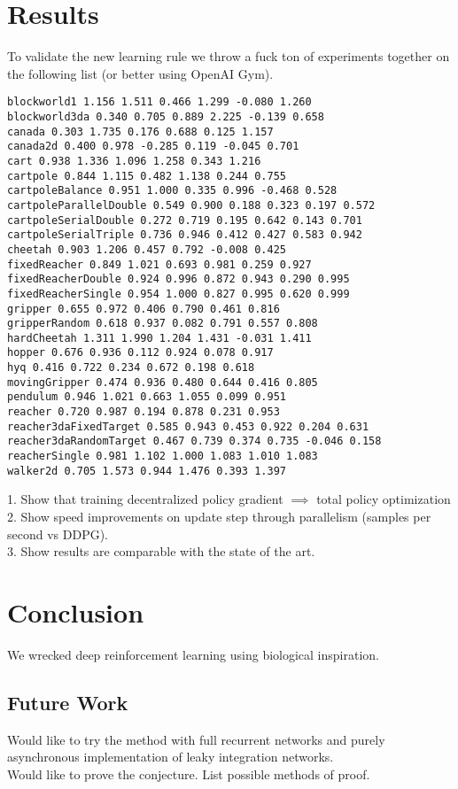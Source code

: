 \documentclass{article} %
\numberwithin{equation}{subsection}
\numberwithin{theorem}{subsection}
\begin{document}
\section{Results}
To validate the new learning rule we throw a fuck ton of experiments together on the following list (or better using OpenAI Gym).
\begin{verbatim}
blockworld1 1.156 1.511 0.466 1.299 -0.080 1.260
blockworld3da 0.340 0.705 0.889 2.225 -0.139 0.658
canada 0.303 1.735 0.176 0.688 0.125 1.157
canada2d 0.400 0.978 -0.285 0.119 -0.045 0.701
cart 0.938 1.336 1.096 1.258 0.343 1.216
cartpole 0.844 1.115 0.482 1.138 0.244 0.755
cartpoleBalance 0.951 1.000 0.335 0.996 -0.468 0.528
cartpoleParallelDouble 0.549 0.900 0.188 0.323 0.197 0.572
cartpoleSerialDouble 0.272 0.719 0.195 0.642 0.143 0.701
cartpoleSerialTriple 0.736 0.946 0.412 0.427 0.583 0.942
cheetah 0.903 1.206 0.457 0.792 -0.008 0.425
fixedReacher 0.849 1.021 0.693 0.981 0.259 0.927
fixedReacherDouble 0.924 0.996 0.872 0.943 0.290 0.995
fixedReacherSingle 0.954 1.000 0.827 0.995 0.620 0.999
gripper 0.655 0.972 0.406 0.790 0.461 0.816
gripperRandom 0.618 0.937 0.082 0.791 0.557 0.808
hardCheetah 1.311 1.990 1.204 1.431 -0.031 1.411
hopper 0.676 0.936 0.112 0.924 0.078 0.917
hyq 0.416 0.722 0.234 0.672 0.198 0.618
movingGripper 0.474 0.936 0.480 0.644 0.416 0.805
pendulum 0.946 1.021 0.663 1.055 0.099 0.951
reacher 0.720 0.987 0.194 0.878 0.231 0.953
reacher3daFixedTarget 0.585 0.943 0.453 0.922 0.204 0.631
reacher3daRandomTarget 0.467 0.739 0.374 0.735 -0.046 0.158
reacherSingle 0.981 1.102 1.000 1.083 1.010 1.083
walker2d 0.705 1.573 0.944 1.476 0.393 1.397
\end{verbatim}
1. Show that training decentralized policy gradient $\implies$ total policy optimization \\[2cm]

2. Show speed improvements on update step through parallelism (samples per second vs DDPG).  \\[2cm]

3. Show results are comparable with the state of the art.

\section{Conclusion}
We wrecked deep reinforcement learning using biological inspiration. \\[2cm]
\subsection{Future Work}
Would like to try the method with full recurrent networks and purely asynchronous implementation of leaky integration networks.\\[2cm]
Would like to prove the conjecture. List possible methods of proof.\\[2cm]



%
\end{document}
